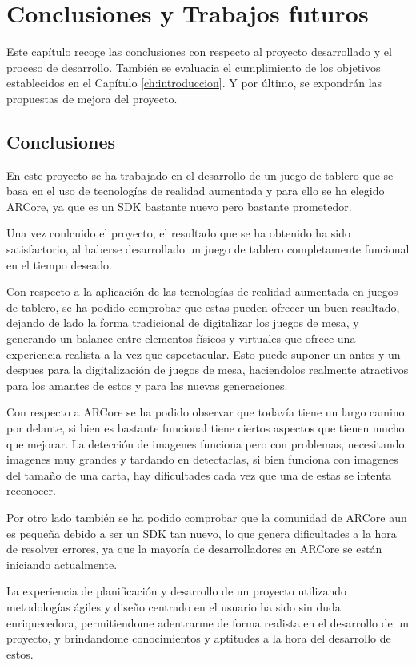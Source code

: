 \chapter{Conclusiones y Trabajos futuros}
\label{ch:conclusiones}
Este capítulo recoge las conclusiones con respecto al proyecto desarrollado y el proceso de desarrollo. También se evaluacia el cumplimiento de los objetivos establecidos en el Capítulo \ref{ch:introduccion}. Y por último, se expondrán las propuestas de mejora del proyecto.

\section{Conclusiones}
En este proyecto se ha trabajado en el desarrollo de un juego de tablero que se basa en el uso de tecnologías de realidad aumentada
y para ello se ha elegido ARCore, ya que es un SDK bastante nuevo pero bastante prometedor.

Una vez conlcuido el proyecto, el resultado que se ha obtenido ha sido satisfactorio, al haberse desarrollado un juego de tablero completamente funcional en el tiempo deseado.

Con respecto a la aplicación de las tecnologías de realidad aumentada en juegos de tablero, se ha podido comprobar que estas pueden ofrecer un buen resultado, dejando de lado la forma tradicional de digitalizar los juegos de mesa, y generando un balance entre elementos físicos y virtuales que ofrece una experiencia realista a la vez que espectacular. Esto puede suponer un antes y un despues para la digitalización de juegos de mesa, haciendolos realmente atractivos para los amantes de estos y para las nuevas generaciones.

Con respecto a ARCore se ha podido observar que todavía tiene un largo camino por delante, si bien es bastante funcional tiene ciertos aspectos que tienen mucho que mejorar. La detección de imagenes funciona pero con problemas, necesitando imagenes muy grandes y tardando en detectarlas, si bien funciona con imagenes del tamaño de una carta, hay dificultades cada vez que una de estas se intenta reconocer.

Por otro lado también se ha podido comprobar que la comunidad de ARCore aun es pequeña debido a ser un SDK tan nuevo, lo que genera dificultades a la hora de resolver errores, ya que la mayoría de desarrolladores en ARCore se están iniciando actualmente.

La experiencia de planificación y desarrollo de un proyecto utilizando metodologías ágiles y diseño centrado en el usuario ha sido sin duda enriquecedora, permitiendome adentrarme de forma realista en el desarrollo de un proyecto, y brindandome conocimientos y aptitudes a la hora del desarrollo de estos.

